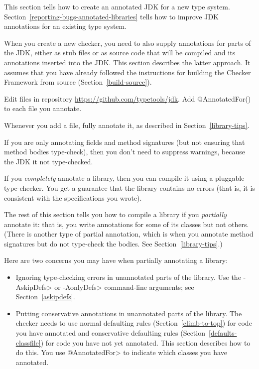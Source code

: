 
This section tells how to create an annotated JDK for a new type system.
Section~\ref{reporting-bugs-annotated-libraries} tells how to improve
JDK annotations for an existing type system.

When you create a new checker, you need to also supply annotations for
parts of the JDK, either as stub files or as source code that will be
compiled and its annotations inserted into the JDK\@.  This
section describes the latter approach.
It assumes that you have already followed the instructions for building the
Checker Framework from source (Section~\ref{build-source}).

Edit files in repository \url{https://github.com/typetools/jdk}.  Add
@AnnotatedFor() to each file you annotate.

Whenever you add a file, fully annotate it, as described in
Section~\ref{library-tips}.

If you are only annotating fields and method signatures (but not
ensuring that method bodies type-check), then you don't need to suppress
warnings, because the JDK it not type-checked.



If you \emph{completely} annotate a library, then you can compile it using a
pluggable type-checker.  You get a guarantee that the library contains no
errors (that is, it is consistent with the specifications you wrote).

The rest of this section tells you how to compile a library if you
\emph{partially} annotate it:  that is, you write annotations for some of its
classes but not others.
(There is another type of partial annotation, which is when you annotate
method signatures but do not type-check the bodies.
See Section~\ref{library-tips}.)

Here are two concerns you may have when partially annotating a library:

\begin{itemize}
\item
  Ignoring type-checking errors in unannotated parts of the library.
  Use the \<-AskipDefs> or \<-AonlyDefs> command-line arguments; see
  Section~\ref{askipdefs}.

\item
  Putting conservative annotations in unannotated parts of the library.
  The checker needs to use normal defaulting rules
  (Section~\ref{climb-to-top}) for code you have annotated and conservative
  defaulting rules (Section~\ref{defaults-classfile}) for code you have not
  yet annotated.  This section describes how to do this.  You use
  \<@AnnotatedFor> to indicate which classes you have annotated.
\end{itemize}




